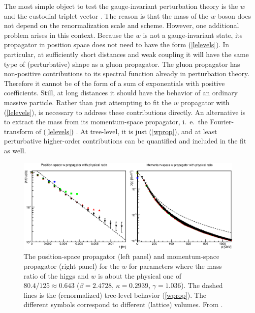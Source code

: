 \documentclass[final,twoside,12pt]{article}
\newcommand*{\pref}[1]{(\ref{#1})}
\newcommand*{\1}{1\!\!\!\bot}
\begin{document}
The most simple object to test the gauge-invariant perturbation theory is the $w$ and the custodial triplet vector \cite{Maas:2012tj}. The reason is that the mass of the $w$ boson does not depend on the renormalization scale and scheme. However, one additional problem arises in this context. Because the $w$ is not a gauge-invariant state, its propagator in position space does not need to have the form \pref{lelevels}. In particular, at sufficiently short distances and weak coupling it will have the same type of (perturbative) shape as a gluon propagator. The gluon propagator has  non-positive contributions to its spectral function \cite{Bohm:2001yx} already in perturbation theory. Therefore it cannot be of the form of a sum of exponentials with positive coefficients. Still, at long distances it should have the behavior of an ordinary massive particle. Rather than just attempting to fit the $w$ propagator with \pref{lelevels}, is necessary to address these contributions directly. An alternative is to extract the mass from its momentum-space propagator, i.\ e.\ the Fourier-transform of \pref{lelevels} \cite{Maas:2011se}. At tree-level, it is just \pref{wprop}, and at least perturbative higher-order contributions can be quantified and included in the fit as well.

\begin{figure}
\includegraphics[width=\linewidth]{w}
\caption{\label{fig:w}The position-space propagator (left panel) and momentum-space propagator (right panel) for the $w$ for parameters where the mass ratio of the higgs and $w$ is about the physical one of $80.4/125\approx0.643$ ($\beta=2.4728$, $\kappa=0.2939$, $\gamma=1.036$). The dashed lines is the (renormalized) tree-level behavior \pref{wprop}. The different symbols correspond to different (lattice) volumes. From \cite{Maas:2013aia}.}
\end{figure}
\end{document}
